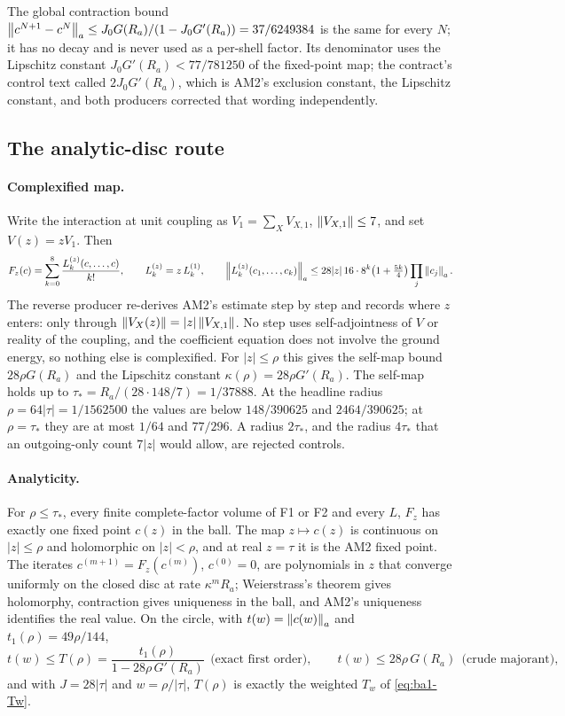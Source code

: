 The global contraction bound
$\left\lVert c^{N+1}-c^N\right\rVert_a\le J_0G(R_a)/(1-J_0G'(R_a))=37/6249384$ is the same
for every $N$; it has no decay and is never used as a per-shell factor. Its
denominator uses the Lipschitz constant $J_0G'(R_a)<77/781250$ of the
fixed-point map; the contract's control text called $2J_0G'(R_a)$, which is
AM2's exclusion constant, the Lipschitz constant, and both producers corrected
that wording independently.

\subsection{The analytic-disc route}
\label{sec:ba1-disc}
\paragraph{Complexified map.} Write the interaction at unit coupling as
$V_1=\sum_XV_{X,1}$, $\left\lVert V_{X,1}\right\rVert\le7$, and set $V(z)=zV_1$. Then
\begin{equation}
 F_z(c)=\sum_{k=0}^{8}\frac{L^{(z)}_k(c,\ldots,c)}{k!},\qquad
 L^{(z)}_k=z\,L^{(1)}_k,\qquad
 \left\lVert L^{(z)}_k(c_1,\ldots,c_k)\right\rVert_a\le28|z|\,16\cdot8^k\bigl(1+\tfrac{5k}{4}\bigr)\prod_j\left\lVert c_j\right\rVert_a .
 \label{eq:ba1-complex}
\end{equation}
The reverse producer re-derives AM2's estimate step by step and records where
$z$ enters: only through $\left\lVert V_X(z)\right\rVert=|z|\left\lVert V_{X,1}\right\rVert$. No step uses
self-adjointness of $V$ or reality of the coupling, and the coefficient
equation does not involve the ground energy, so nothing else is complexified.
For $|z|\le\rho$ this gives the self-map bound $28\rho G(R_a)$ and the
Lipschitz constant $\kappa(\rho)=28\rho G'(R_a)$. The self-map holds up to
$\tau_*=R_a/(28\cdot148/7)=1/37888$. At the headline radius
$\rho=64|\tau|=1/1562500$ the values are below $148/390625$ and
$2464/390625$; at $\rho=\tau_*$ they are at most $1/64$ and $77/296$. A
radius $2\tau_*$, and the radius $4\tau_*$ that an outgoing-only count $7|z|$
would allow, are rejected controls.

\paragraph{Analyticity.} For $\rho\le\tau_*$, every finite complete-factor
volume of F1 or F2 and every $L$, $F_z$ has exactly one fixed point $c(z)$ in
the ball. The map $z\mapsto c(z)$ is continuous on $|z|\le\rho$ and
holomorphic on $|z|<\rho$, and at real $z=\tau$ it is the AM2 fixed point.
The iterates $c^{(m+1)}=F_z(c^{(m)})$, $c^{(0)}=0$, are polynomials in $z$
that converge uniformly on the closed disc at rate $\kappa^mR_a$; Weierstrass's
theorem gives holomorphy, contraction gives uniqueness in the ball, and AM2's
uniqueness identifies the real value. On the circle, with
$t(w)=\left\lVert c(w)\right\rVert_a$ and $t_1(\rho)=49\rho/144$,
\begin{equation}
 t(w)\le T(\rho)=\frac{t_1(\rho)}{1-28\rho\,G'(R_a)}\ \
 \text{(exact first order)},\qquad
 t(w)\le28\rho\,G(R_a)\ \ \text{(crude majorant)},
 \label{eq:ba1-circle}
\end{equation}
and with $J=28|\tau|$ and $w=\rho/|\tau|$, $T(\rho)$ is exactly the weighted
$T_w$ of \eqref{eq:ba1-Tw}.

